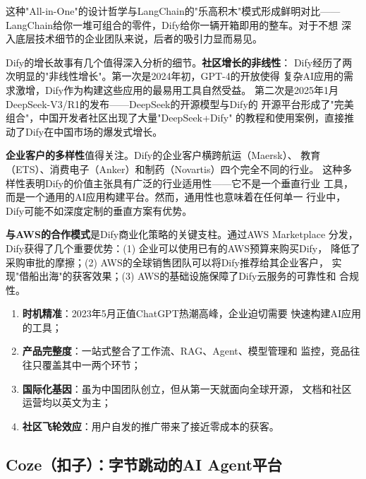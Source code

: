 这种"All-in-One"的设计哲学与LangChain的"乐高积木"模式形成鲜明对比——
LangChain给你一堆可组合的零件，Dify给你一辆开箱即用的整车。对于不想
深入底层技术细节的企业团队来说，后者的吸引力显而易见。

Dify的增长故事有几个值得深入分析的细节。\textbf{社区增长的非线性}：
Dify经历了两次明显的"非线性增长"。第一次是2024年初，GPT-4的开放使得
复杂AI应用的需求激增，Dify作为构建这些应用的最易用工具自然受益。
第二次是2025年1月DeepSeek-V3/R1的发布——DeepSeek的开源模型与Dify的
开源平台形成了"完美组合"，中国开发者社区出现了大量"DeepSeek+Dify"
的教程和使用案例，直接推动了Dify在中国市场的爆发式增长。

\textbf{企业客户的多样性}值得关注。Dify的企业客户横跨航运（Maersk）、
教育（ETS）、消费电子（Anker）和制药（Novartis）四个完全不同的行业。
这种多样性表明Dify的价值主张具有广泛的行业适用性——它不是一个垂直行业
工具，而是一个通用的AI应用构建平台。然而，通用性也意味着在任何单一
行业中，Dify可能不如深度定制的垂直方案有优势。

\textbf{与AWS的合作模式}是Dify商业化策略的关键支柱。通过AWS Marketplace
分发，Dify获得了几个重要优势：(1) 企业可以使用已有的AWS预算来购买Dify，
降低了采购审批的摩擦；(2) AWS的全球销售团队可以将Dify推荐给其企业客户，
实现"借船出海"的获客效果；(3) AWS的基础设施保障了Dify云服务的可靠性和
合规性。

\begin{whybox}[Dify为何能在开源AI平台赛道胜出？]
\begin{enumerate}
  \item \textbf{时机精准}：2023年5月正值ChatGPT热潮高峰，企业迫切需要
    快速构建AI应用的工具；
  \item \textbf{产品完整度}：一站式整合了工作流、RAG、Agent、模型管理和
    监控，竞品往往只覆盖其中一两个环节；
  \item \textbf{国际化基因}：虽为中国团队创立，但从第一天就面向全球开源，
    文档和社区运营均以英文为主；
  \item \textbf{社区飞轮效应}：用户自发的推广带来了接近零成本的获客。
\end{enumerate}
\end{whybox}

\subsection{Coze（扣子）：字节跳动的AI Agent平台}
\label{subsec:coze}

